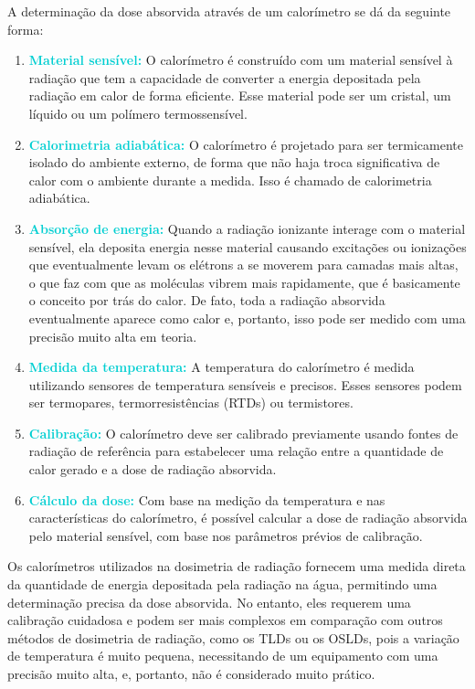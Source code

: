 \documentclass[11pt,a4paper]{article}
\begin{document}
		A determinação da dose absorvida através de um calorímetro se dá da seguinte forma:

		\begin{enumerate}
			\item \textcolor{DarkTurquoise}{\textbf{Material sensível:}} O calorímetro é construído com um material sensível à radiação que tem a capacidade de converter a energia depositada pela radiação em calor de forma eficiente. Esse material pode ser um cristal, um líquido ou um polímero termossensível.
			\item \textcolor{DarkTurquoise}{\textbf{Calorimetria adiabática:}} O calorímetro é projetado para ser termicamente isolado do ambiente externo, de forma que não haja troca significativa de calor com o ambiente durante a medida. Isso é chamado de calorimetria adiabática.
			\item \textcolor{DarkTurquoise}{\textbf{Absorção de energia:}} Quando a radiação ionizante interage com o material sensível, ela deposita energia nesse material causando excitações ou ionizações que eventualmente levam os elétrons a se moverem para camadas mais altas, o que faz com que as moléculas vibrem mais rapidamente, que é basicamente o conceito por trás do calor. De fato, toda a radiação absorvida eventualmente aparece como calor e, portanto, isso pode ser medido com uma precisão muito alta em teoria.
			\item \textcolor{DarkTurquoise}{\textbf{Medida da temperatura:}} A temperatura do calorímetro é medida utilizando sensores de temperatura sensíveis e precisos. Esses sensores podem ser termopares, termorresistências (RTDs) ou termistores.
			\item \textcolor{DarkTurquoise}{\textbf{Calibração:}} O calorímetro deve ser calibrado previamente usando fontes de radiação de referência para estabelecer uma relação entre a quantidade de calor gerado e a dose de radiação absorvida.
			\item \textcolor{DarkTurquoise}{\textbf{Cálculo da dose:}} Com base na medição da temperatura e nas características do calorímetro, é possível calcular a dose de radiação absorvida pelo material sensível, com base nos parâmetros prévios de calibração. 
		\end{enumerate}

		Os calorímetros utilizados na dosimetria de radiação fornecem uma medida direta da quantidade de energia depositada pela radiação na água, permitindo uma determinação precisa da dose absorvida. No entanto, eles requerem uma calibração cuidadosa e podem ser mais complexos em comparação com outros métodos de dosimetria de radiação, como os TLDs ou os OSLDs, pois a variação de temperatura é muito pequena, necessitando de um equipamento com uma precisão muito alta, e, portanto, não é considerado muito prático.
\end{document}
